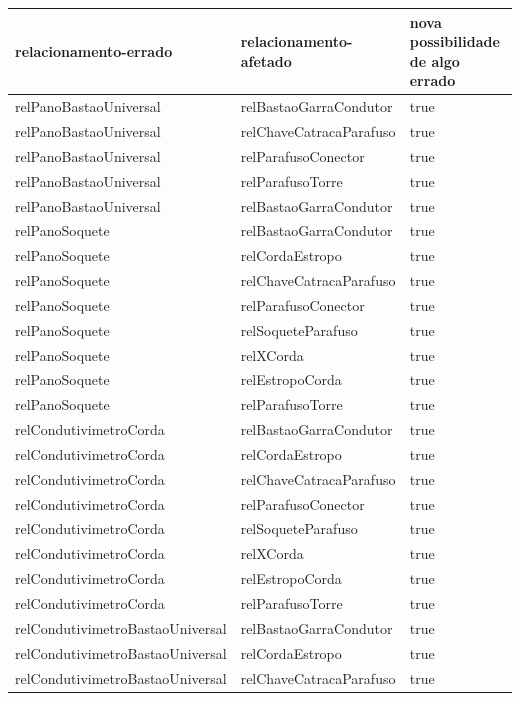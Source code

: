 \documentclass[12pt]{article}
\begin{document}
\begin{table}[H]
\centering
{}
\begin{tabular}{|l|l|l|}
\hline
\textbf{relacionamento-errado} & \textbf{relacionamento-afetado} & \textbf{nova possibilidade de algo errado} \\ \hline
relPanoBastaoUniversal & relBastaoGarraCondutor & true \\ \hline
relPanoBastaoUniversal & relChaveCatracaParafuso & true \\ \hline
relPanoBastaoUniversal & relParafusoConector & true \\ \hline
relPanoBastaoUniversal & relParafusoTorre & true \\ \hline
relPanoBastaoUniversal & relBastaoGarraCondutor & true \\ \hline
relPanoSoquete & relBastaoGarraCondutor & true \\ \hline
relPanoSoquete & relCordaEstropo & true \\ \hline
relPanoSoquete & relChaveCatracaParafuso & true \\ \hline
relPanoSoquete & relParafusoConector & true \\ \hline
relPanoSoquete & relSoqueteParafuso & true \\ \hline
relPanoSoquete & relXCorda & true \\ \hline
relPanoSoquete & relEstropoCorda & true \\ \hline
relPanoSoquete & relParafusoTorre & true \\ \hline
relCondutivimetroCorda & relBastaoGarraCondutor & true \\ \hline
relCondutivimetroCorda & relCordaEstropo & true \\ \hline
relCondutivimetroCorda & relChaveCatracaParafuso & true \\ \hline
relCondutivimetroCorda & relParafusoConector & true \\ \hline
relCondutivimetroCorda & relSoqueteParafuso & true \\ \hline
relCondutivimetroCorda & relXCorda & true \\ \hline
relCondutivimetroCorda & relEstropoCorda & true \\ \hline
relCondutivimetroCorda & relParafusoTorre & true \\ \hline
relCondutivimetroBastaoUniversal & relBastaoGarraCondutor & true \\ \hline
relCondutivimetroBastaoUniversal & relCordaEstropo & true \\ \hline
relCondutivimetroBastaoUniversal & relChaveCatracaParafuso & true \\ \hline

\end{tabular}
\end{table}
\end{document}
